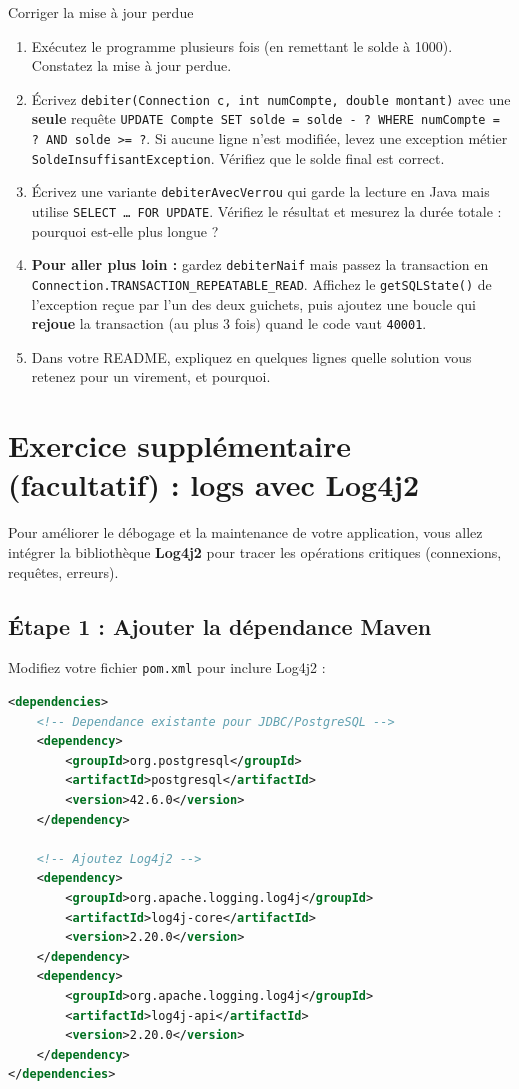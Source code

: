 \documentclass[11pt]{article}
\begin{document}
\begin{exobox}{Corriger la mise à jour perdue}
\begin{enumerate}[label=\alph*)]
  \item Exécutez le programme plusieurs fois (en remettant le solde à 1000). Constatez la mise à jour perdue.
  \item Écrivez \texttt{debiter(Connection c, int numCompte, double montant)} avec une \textbf{seule} requête
        \texttt{UPDATE Compte SET solde = solde - ? WHERE numCompte = ? AND solde >= ?}.
        Si aucune ligne n'est modifiée, levez une exception métier \texttt{SoldeInsuffisantException}.
        Vérifiez que le solde final est correct.
  \item Écrivez une variante \texttt{debiterAvecVerrou} qui garde la lecture en Java mais utilise
        \texttt{SELECT \ldots{} FOR UPDATE}. Vérifiez le résultat et mesurez la durée totale : pourquoi
        est-elle plus longue ?
  \item \textbf{Pour aller plus loin :} gardez \texttt{debiterNaif} mais passez la transaction en
        \texttt{Connection.TRANSACTION\_REPEATABLE\_READ}. Affichez le \texttt{getSQLState()} de l'exception
        reçue par l'un des deux guichets, puis ajoutez une boucle qui \textbf{rejoue} la transaction
        (au plus 3 fois) quand le code vaut \texttt{40001}.
  \item Dans votre README, expliquez en quelques lignes quelle solution vous retenez pour un virement, et pourquoi.
\end{enumerate}
\end{exobox}

\section{Exercice supplémentaire (facultatif) : logs avec Log4j2}
Pour améliorer le débogage et la maintenance de votre application, vous allez intégrer la bibliothèque \textbf{Log4j2} pour tracer les opérations critiques (connexions, requêtes, erreurs).

\subsection{Étape 1 : Ajouter la dépendance Maven}
Modifiez votre fichier \texttt{pom.xml} pour inclure Log4j2 :

\begin{lstlisting}[language=XML]
<dependencies>
    <!-- Dependance existante pour JDBC/PostgreSQL -->
    <dependency>
        <groupId>org.postgresql</groupId>
        <artifactId>postgresql</artifactId>
        <version>42.6.0</version>
    </dependency>

    <!-- Ajoutez Log4j2 -->
    <dependency>
        <groupId>org.apache.logging.log4j</groupId>
        <artifactId>log4j-core</artifactId>
        <version>2.20.0</version>
    </dependency>
    <dependency>
        <groupId>org.apache.logging.log4j</groupId>
        <artifactId>log4j-api</artifactId>
        <version>2.20.0</version>
    </dependency>
</dependencies>
\end{lstlisting}
\end{document}
